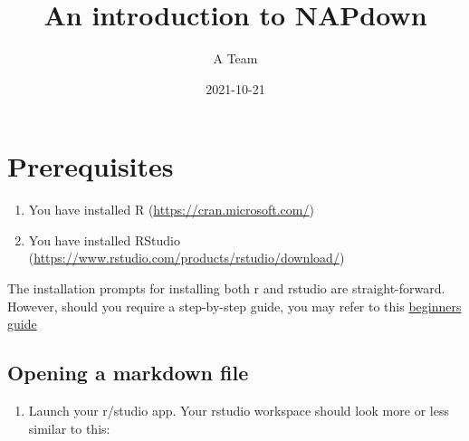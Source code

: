 \documentclass[
]{book}
\title{An introduction to NAPdown}
\author{A Team}
\date{2021-10-21}
\providecommand{\tightlist}{%
  \setlength{\itemsep}{0pt}\setlength{\parskip}{0pt}}
\begin{document}
\maketitle

{
\setcounter{tocdepth}{1}
\tableofcontents
}
\hypertarget{prerequisites}{%
\chapter{Prerequisites}\label{prerequisites}}

\begin{enumerate}
\def\labelenumi{\arabic{enumi}.}
\tightlist
\item
  You have installed R (\url{https://cran.microsoft.com/})
\item
  You have installed RStudio (\url{https://www.rstudio.com/products/rstudio/download/})
\end{enumerate}

The installation prompts for installing both r and rstudio are straight-forward.
However, should you require a step-by-step guide, you may refer to this \href{https://techvidvan.com/tutorials/install-r/}{beginners guide}

\hypertarget{opening-a-markdown-file}{%
\section{Opening a markdown file}\label{opening-a-markdown-file}}

\begin{enumerate}
\def\labelenumi{\arabic{enumi}.}
\tightlist
\item
  Launch your r/studio app.
  Your rstudio workspace should look more or less similar to this:
\end{enumerate}
\end{document}
